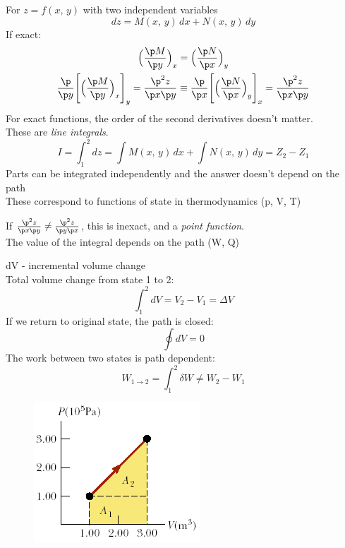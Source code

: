 \documentclass[a4paper, 11pt, normalem]{report}
\begin{document}
For $z = f(x,\,y)$ with two independent variables
\begin{equation*}
    dz = M(x,\,y)\,dx + N(x,\,y)\,dy
\end{equation*}
If exact:
\begin{gather*}
    \Big(\frac{\p M}{\p y} \Big)_x = \Big(\frac{\p N}{\p x} \Big)_y \\
    \frac{\p}{\p y}\Bigg[\Big(\frac{\p M}{\p y} \Big)_x \Bigg]_y = \frac{\p^2 z}{\p x \p y} \equiv \frac{\p}{\p x}\Bigg[\Big(\frac{\p N}{\p x}\Big)_y \Bigg]_x = \frac{\p^2 z}{\p x \p y}
\end{gather*}
For exact functions, the order of the second derivatives doesn't matter. \\
These are \emph{line integrals}.
\begin{equation*}
    I = \int_{1}^{2} dz = \int M(x,\,y)\,dx + \int N(x,\,y)\,dy = Z_2 - Z_1
\end{equation*}
Parts can be integrated independently and the answer doesn't depend on the path \\
These correspond to functions of state in thermodynamics (p, V, T)

If $\frac{\p^2 z}{\p x \p y} \neq \frac{\p^2 z}{\p y \p x}$, this is inexact, and a \emph{point function}. \\
The value of the integral depends on the path (W, Q)

dV - incremental volume change \\
Total volume change from state 1 to 2:
\begin{equation*}
    \int_{1}^{2} dV = V_2 - V_1 = \Delta V
\end{equation*}
If we return to original state, the path is closed:
\begin{equation*}
    \oint dV = 0
\end{equation*}
The work between two states is path dependent:
\begin{equation*}
    W_{1 \to 2} = \int_{1}^{2} \delta W \neq W_2 - W_1
\end{equation*}
\begin{figure}
    \begin{center}
        \includegraphics[scale=0.6]{WorkPV.png}
    \end{center}
    \vspace{-120pt}
\end{figure}
\end{document}
